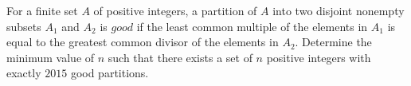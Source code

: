 For a finite set 
$A$
 of positive integers, a partition of 
$A$
 into two disjoint nonempty subsets 
$A_1$
 and 
$A_2$
 is 
$\textit{good}$
 if the least common multiple of the elements in 
$A_1$
 is equal to the greatest common divisor of the elements in 
$A_2$.
 Determine the minimum value of 
$n$
 such that there exists a set of 
$n$
 positive integers with exactly 
$2015$
 good partitions.